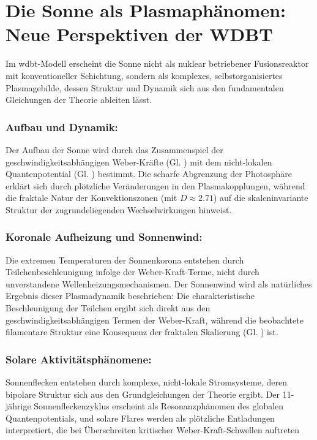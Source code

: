 \section{Die Sonne als Plasmaphänomen: Neue Perspektiven der WDBT}
Im \gls{wdbt}-Modell erscheint die Sonne nicht als nuklear betriebener Fusionsreaktor mit konventioneller Schichtung, sondern als komplexes, selbstorganisiertes Plasmagebilde, dessen Struktur und
Dynamik sich aus den fundamentalen Gleichungen der Theorie ableiten lässt.

\subsubsection{Aufbau und Dynamik:}
Der Aufbau der Sonne wird durch das Zusammenspiel der geschwindigkeitsabhängigen Weber-Kräfte (Gl. ) mit dem nicht-lokalen Quantenpotential (Gl. )
bestimmt. Die scharfe Abgrenzung der Photosphäre erklärt sich durch plötzliche Veränderungen in den Plasmakopplungen, während die fraktale Natur der Konvektionszonen (mit $D \approx 2.71$) auf die
skaleninvariante Struktur der zugrundeliegenden Wechselwirkungen hinweist.

\subsubsection{Koronale Aufheizung und Sonnenwind:}
Die extremen Temperaturen der Sonnenkorona entstehen durch Teilchenbeschleunigung infolge der Weber-Kraft-Terme, nicht durch unverstandene Wellenheizungsmechanismen. Der Sonnenwind wird als natürliches
Ergebnis dieser Plasmadynamik beschrieben: Die charakteristische Beschleunigung der Teilchen ergibt sich direkt aus den geschwindigkeitsabhängigen Termen der Weber-Kraft, während die beobachtete
filamentare Struktur eine Konsequenz der fraktalen Skalierung (Gl. ) ist.

\subsubsection{Solare Aktivitätsphänomene:}
Sonnenflecken entstehen durch komplexe, nicht-lokale Stromsysteme, deren bipolare Struktur sich aus den Grundgleichungen der Theorie ergibt. Der 11-jährige Sonnenfleckenzyklus erscheint als
Resonanzphänomen des globalen Quantenpotentials, und solare Flares werden als plötzliche Entladungen interpretiert, die bei Überschreiten kritischer Weber-Kraft-Schwellen auftreten

